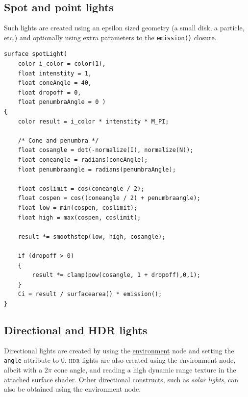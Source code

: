 \documentclass[oneside,ebook]{memoir}
\newcommand*{\acronym}[1]{\textsc{\lowercase{#1}}}
\begin{document}
\subsection{Spot and point lights}
Such lights are created using an epsilon sized geometry (a small disk, a particle, etc.) and optionally using extra parameters to the \lstinline|emission()| closure.
\begin{center}
\footnotesize
\begin{lstlisting}[frame=top,frame=bottom,caption={An example \acronym{OSL} spot light shader},label={fig:spotlight}]
surface spotLight(
	color i_color = color(1),
	float intenstity = 1,
	float coneAngle = 40,
	float dropoff = 0,
	float penumbraAngle = 0 )
{
	color result = i_color * intenstity * M_PI;

	/* Cone and penumbra */
	float cosangle = dot(-normalize(I), normalize(N));
	float coneangle = radians(coneAngle);
	float penumbraangle = radians(penumbraAngle);

	float coslimit = cos(coneangle / 2);
	float cospen = cos((coneangle / 2) + penumbraangle);
	float low = min(cospen, coslimit);
	float high = max(cospen, coslimit);

	result *= smoothstep(low, high, cosangle);

	if (dropoff > 0)
	{
		result *= clamp(pow(cosangle, 1 + dropoff),0,1);
	}
	Ci = result / surfacearea() * emission();
}
\end{lstlisting}
\end{center}

\subsection{Directional and HDR lights}
Directional lights are created by using the \hyperref[section:environmentnode]{environment} node and setting the \lstinline|angle| attribute to 0. \acronym{HDR} lights are also created using the environment node, albeit with a \(2\pi\) cone angle, and reading a high dynamic range texture in the attached surface shader. Other directional constructs, such as \emph{solar lights}, can also be obtained using the environment node.
\end{document}
